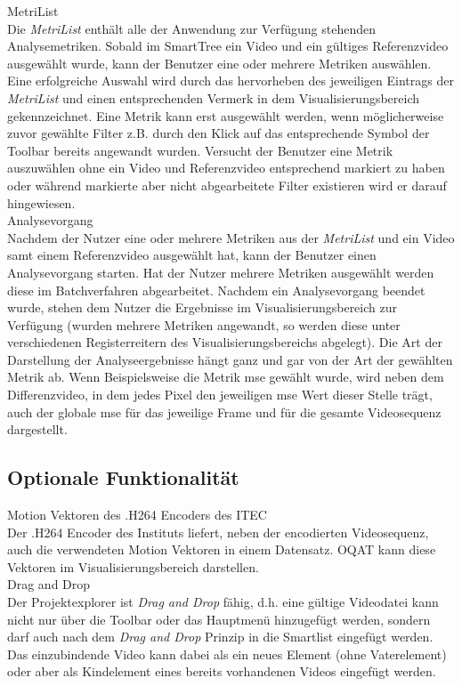 %
 MetriList\\
Die \emph{MetriList} enthält alle der Anwendung zur Verfügung stehenden Analysemetriken.
Sobald im SmartTree ein Video und ein gültiges Referenzvideo ausgewählt wurde, kann der Benutzer
eine oder mehrere Metriken auswählen. Eine erfolgreiche Auswahl wird durch das hervorheben des
jeweiligen Eintrags der \emph{MetriList} und einen entsprechenden Vermerk in dem Visualisierungsbereich
gekennzeichnet. Eine Metrik kann erst ausgewählt werden, wenn möglicherweise zuvor gewählte Filter
z.B. durch den Klick auf das entsprechende Symbol der Toolbar bereits angewandt wurden. Versucht
der Benutzer eine Metrik auszuwählen ohne ein Video und Referenzvideo entsprechend markiert zu haben oder
während markierte aber nicht abgearbeitete Filter existieren wird er darauf hingewiesen.\\
 Analysevorgang \\
Nachdem der Nutzer eine oder mehrere Metriken aus der \emph{MetriList} und ein
Video samt einem Referenzvideo ausgewählt hat, kann der Benutzer einen Analysevorgang starten. Hat der
Nutzer mehrere Metriken ausgewählt werden diese im Batchverfahren abgearbeitet. Nachdem ein Analysevorgang
beendet wurde, stehen dem Nutzer die Ergebnisse im Visualisierungsbereich zur Verfügung (wurden 
mehrere Metriken angewandt, so werden diese unter verschiedenen Registerreitern des Visualisierungsbereichs
abgelegt). Die Art der Darstellung der Analyseergebnisse hängt ganz und gar von der Art der gewählten 
Metrik ab. Wenn Beispielsweise die Metrik \gls{mse} gewählt wurde, wird neben dem Differenzvideo, in dem jedes Pixel den jeweiligen \gls{mse} Wert dieser Stelle trägt, auch der globale \gls{mse} für das jeweilige Frame und für die gesamte Videosequenz dargestellt.

\subsection{Optionale Funktionalität}
\setcounter{counterKriterien}{0}
 Motion Vektoren des .H264 Encoders des \gls{ITEC}\\
Der .H264 Encoder des Instituts liefert, neben der encodierten Videosequenz, auch die verwendeten Motion
Vektoren in einem Datensatz. \gls{OQAT} kann diese Vektoren im Visualisierungsbereich darstellen.\\
 Drag and Drop\\
Der Projektexplorer ist \emph{Drag and Drop} fähig, d.h. eine gültige Videodatei kann nicht nur über
die Toolbar oder das Hauptmenü hinzugefügt werden, sondern darf auch nach dem \emph{Drag and Drop} Prinzip
in die Smartlist eingefügt werden. Das einzubindende Video kann dabei als ein neues Element (ohne
Vaterelement) oder aber als Kindelement eines bereits vorhandenen Videos eingefügt werden.
